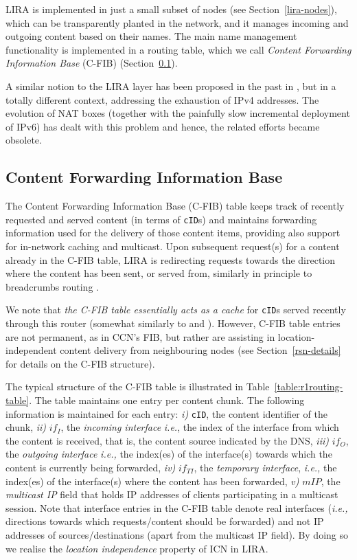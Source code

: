 \documentclass{sig-alternate}
\newcommand{\ie}{{\em i.e.,\/ }}
\begin{document}
LIRA is implemented in just a small subset of nodes (see Section~\ref{lira-nodes}), which can be transparently planted in the network, and it manages incoming and outgoing content based on their names. The main name management functionality is implemented in a routing table, which we call \textit{Content Forwarding Information Base} (C-FIB) (Section~\ref{rsn-table}).

A similar notion to the LIRA layer has been proposed in the past in \cite{triad}, but in a totally different context, addressing the exhaustion of IPv4 addresses. The evolution of NAT boxes (together with the painfully slow incremental deployment of IPv6) has dealt with this problem and hence, the related efforts became obsolete.

\subsection{Content Forwarding Information Base}\label{rsn-table}

The Content Forwarding Information Base (C-FIB) table keeps track of recently requested and served content (in terms of \texttt{cID}s) and maintains forwarding information used for the delivery of those content items, providing also support for in-network caching and multicast. Upon subsequent request(s) for a content already in the C-FIB table, LIRA is redirecting requests towards the direction where the content has been sent, or served from, similarly in principle to breadcrumbs routing \cite{breadcrumbs}.

We note that \textit{the C-FIB table essentially acts as a cache} for \texttt{cID}s served recently through this router (somewhat similarly to \cite{scan} and \cite{conet-comnet}). However, C-FIB table entries are not permanent, as in CCN's FIB, but rather are assisting in location-independent content delivery from neighbouring nodes (see Section~\ref{rsn-details} for details on the C-FIB structure).

The typical structure of the C-FIB table is illustrated in Table~\ref{table:r1routing-table}. The table maintains one entry per content chunk. The following information is maintained for each entry: \textit{i)} \texttt{cID}, the content identifier of the chunk, \textit{ii)} $if_{I}$, the \textit{incoming interface} \textit{i.e.}, the index of the interface from which the content is received, that is, the content source indicated by the DNS, \textit{iii)} $if_{O}$, the \textit{outgoing interface} \ie the index(es) of the interface(s) towards which the content is currently being forwarded, \textit{iv)} $if_{TI}$, the \textit{temporary interface}, \ie the index(es) of the interface(s) where the content has been forwarded, \textit{v)} $mIP$, the \textit{multicast IP} field that holds IP addresses of clients participating in a multicast session.
Note that interface entries in the C-FIB table denote real interfaces (\ie directions towards which requests/content should be forwarded) and not IP addresses of sources/destinations (apart from the multicast IP field). By doing so we realise the \textit{location independence} property of ICN in LIRA.
\end{document}
